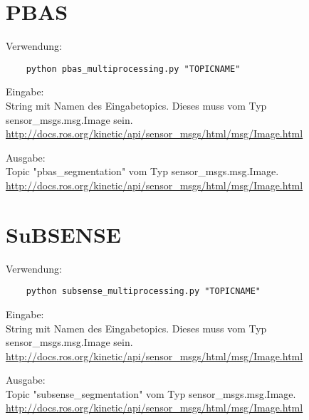 \documentclass{article}
\begin{document}
	\section*{PBAS}
	Verwendung:
	\begin{lstlisting}
	python pbas_multiprocessing.py "TOPICNAME"
	\end{lstlisting}
	\vspace{1em}
	Eingabe: \\
	
	String mit Namen des Eingabetopics. Dieses muss vom Typ sensor\_msgs.msg.Image sein.\\
	\url{http://docs.ros.org/kinetic/api/sensor_msgs/html/msg/Image.html}
	\vspace{1em}
	\vspace{1em}
	
	Ausgabe: \\
	
	Topic "pbas\_segmentation" vom Typ sensor\_msgs.msg.Image.\\
	\url{http://docs.ros.org/kinetic/api/sensor_msgs/html/msg/Image.html}
	
	\section*{SuBSENSE}
	Verwendung:
	\begin{lstlisting}
	python subsense_multiprocessing.py "TOPICNAME"
	\end{lstlisting}
	\vspace{1em}
	Eingabe: \\
	
	String mit Namen des Eingabetopics. Dieses muss vom Typ sensor\_msgs.msg.Image sein.\\
	\url{http://docs.ros.org/kinetic/api/sensor_msgs/html/msg/Image.html}
	\vspace{1em}
	\vspace{1em}
	
	Ausgabe: \\
	
	Topic "subsense\_segmentation" vom Typ sensor\_msgs.msg.Image.\\
	\url{http://docs.ros.org/kinetic/api/sensor_msgs/html/msg/Image.html}
\end{document}
